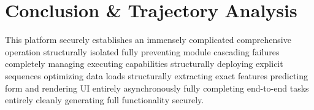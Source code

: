 \documentclass[12pt,a4paper]{article}
\begin{document}
\section{Conclusion \& Trajectory Analysis}
This platform securely establishes an immensely complicated comprehensive operation structurally isolated fully preventing module cascading failures completely managing executing capabilities structurally deploying explicit sequences optimizing data loads structurally extracting exact features predicting form and rendering UI entirely asynchronously fully completing end-to-end tasks entirely cleanly generating full functionality securely. 
\end{document}
